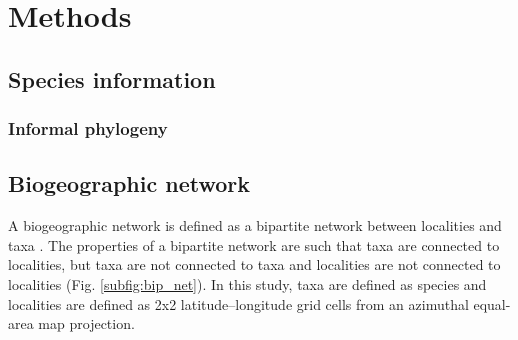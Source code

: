 \documentclass[12pt,letterpaper]{article}
\begin{document}
\section{Methods}
\subsection{Species information}

\subsubsection{Informal phylogeny}

\subsection{Biogeographic network}

A biogeographic network is defined as a bipartite network between localities and taxa \citep{Vilhena2013b,Vilhena2013,Sidor2013}. The properties of a bipartite network are such that taxa are connected to localities, but taxa are not connected to taxa and localities are not connected to localities (Fig. \ref{subfig:bip_net}). In this study, taxa are defined as species and localities are defined as 2x2 latitude--longitude grid cells from an azimuthal equal-area map projection.
\end{document}
